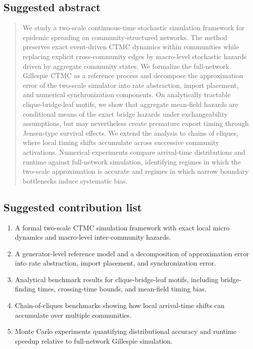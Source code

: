 \documentclass[12pt,a4paper]{article}
\theoremstyle{definition}
\newcommand{\1}{\mathbf{1}}
\begin{document}
\subsection{Suggested abstract}

\begin{quote}
We study a two-scale continuous-time stochastic simulation framework for epidemic spreading on community-structured networks.  The method preserves exact event-driven CTMC dynamics within communities while replacing explicit cross-community edges by macro-level stochastic hazards driven by aggregate community states.  We formalize the full-network Gillespie CTMC as a reference process and decompose the approximation error of the two-scale simulator into rate abstraction, import placement, and numerical synchronization components.  On analytically tractable clique-bridge-leaf motifs, we show that aggregate mean-field hazards are conditional means of the exact bridge hazards under exchangeability assumptions, but may nevertheless create premature export timing through Jensen-type survival effects.  We extend the analysis to chains of cliques, where local timing shifts accumulate across successive community activations.  Numerical experiments compare arrival-time distributions and runtime against full-network simulation, identifying regimes in which the two-scale approximation is accurate and regimes in which narrow boundary bottlenecks induce systematic bias.
\end{quote}

\subsection{Suggested contribution list}

\begin{enumerate}
    \item A formal two-scale CTMC simulation framework with exact local micro dynamics and macro-level inter-community hazards.
    \item A generator-level reference model and a decomposition of approximation error into rate abstraction, import placement, and synchronization error.
    \item Analytical benchmark results for clique-bridge-leaf motifs, including bridge-finding times, crossing-time bounds, and mean-field timing bias.
    \item Chain-of-cliques benchmarks showing how local arrival-time shifts can accumulate over multiple communities.
    \item Monte Carlo experiments quantifying distributional accuracy and runtime speedup relative to full-network Gillespie simulation.
\end{enumerate}
\end{document}
